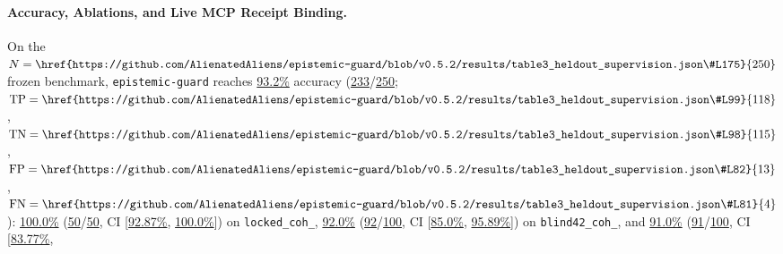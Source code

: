 \documentclass[10pt,twocolumn]{article}
\begin{document}
\paragraph{Accuracy, Ablations, and Live MCP Receipt Binding.}
On the $N=\href{https://github.com/AlienatedAliens/epistemic-guard/blob/v0.5.2/results/table3_heldout_supervision.json\#L175}{250}$ frozen benchmark, \texttt{epistemic-guard} reaches \href{https://github.com/AlienatedAliens/epistemic-guard/blob/v0.5.2/results/table3_heldout_supervision.json\#L71}{93.2\%} accuracy (\href{https://github.com/AlienatedAliens/epistemic-guard/blob/v0.5.2/results/table3_heldout_supervision.json\#L80}{233}/\href{https://github.com/AlienatedAliens/epistemic-guard/blob/v0.5.2/results/table3_heldout_supervision.json\#L175}{250}; $\mathrm{TP}=\href{https://github.com/AlienatedAliens/epistemic-guard/blob/v0.5.2/results/table3_heldout_supervision.json\#L99}{118}$, $\mathrm{TN}=\href{https://github.com/AlienatedAliens/epistemic-guard/blob/v0.5.2/results/table3_heldout_supervision.json\#L98}{115}$, $\mathrm{FP}=\href{https://github.com/AlienatedAliens/epistemic-guard/blob/v0.5.2/results/table3_heldout_supervision.json\#L82}{13}$, $\mathrm{FN}=\href{https://github.com/AlienatedAliens/epistemic-guard/blob/v0.5.2/results/table3_heldout_supervision.json\#L81}{4}$): \href{https://github.com/AlienatedAliens/epistemic-guard/blob/v0.5.2/results/table3_heldout_supervision.json\#L88}{100.0\%} (\href{https://github.com/AlienatedAliens/epistemic-guard/blob/v0.5.2/results/table3_heldout_supervision.json\#L91}{50}/\href{https://github.com/AlienatedAliens/epistemic-guard/blob/v0.5.2/results/table3_heldout_supervision.json\#L191}{50}, CI [\href{https://github.com/AlienatedAliens/epistemic-guard/blob/v0.5.2/results/table3_heldout_supervision.json\#L90}{92.87\%}, \href{https://github.com/AlienatedAliens/epistemic-guard/blob/v0.5.2/results/table3_heldout_supervision.json\#L89}{100.0\%}]) on \texttt{locked\_\allowbreak coh\_}, \href{https://github.com/AlienatedAliens/epistemic-guard/blob/v0.5.2/results/table3_heldout_supervision.json\#L72}{92.0\%} (\href{https://github.com/AlienatedAliens/epistemic-guard/blob/v0.5.2/results/table3_heldout_supervision.json\#L75}{92}/\href{https://github.com/AlienatedAliens/epistemic-guard/blob/v0.5.2/results/table3_heldout_supervision.json\#L190}{100}, CI [\href{https://github.com/AlienatedAliens/epistemic-guard/blob/v0.5.2/results/table3_heldout_supervision.json\#L74}{85.0\%}, \href{https://github.com/AlienatedAliens/epistemic-guard/blob/v0.5.2/results/table3_heldout_supervision.json\#L73}{95.89\%}]) on \texttt{blind42\_\allowbreak coh\_}, and \href{https://github.com/AlienatedAliens/epistemic-guard/blob/v0.5.2/results/table3_heldout_supervision.json\#L92}{91.0\%} (\href{https://github.com/AlienatedAliens/epistemic-guard/blob/v0.5.2/results/table3_heldout_supervision.json\#L95}{91}/\href{https://github.com/AlienatedAliens/epistemic-guard/blob/v0.5.2/results/table3_heldout_supervision.json\#L192}{100}, CI [\href{https://github.com/AlienatedAliens/epistemic-guard/blob/v0.5.2/results/table3_heldout_supervision.json\#L94}{83.77\%}, 
\end{document}
